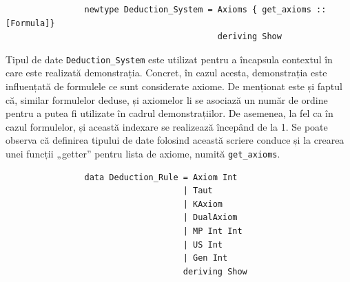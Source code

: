 \documentclass[12pt, openany]{book}
\begin{document}
            \begin{lstlisting}
                newtype Deduction_System = Axioms { get_axioms :: [Formula]}
                                           deriving Show
            \end{lstlisting}

            \par{}
                Tipul de date \texttt{Deduction\_System} este utilizat pentru a încapsula contextul în care este 
                realizată demonstrația. Concret, în cazul acesta, demonstrația este influențată de formulele ce sunt 
                considerate axiome. De menționat este și faptul că, similar formulelor deduse, și axiomelor li se 
                asociază un număr de ordine pentru a putea fi utilizate în cadrul demonstrațiilor. De asemenea, la fel 
                ca în cazul formulelor, și această indexare se realizează începând de la 1. Se poate observa că definirea 
                tipului de date folosind această scriere conduce și la crearea unei funcții „getter” pentru lista de axiome, numită 
                \texttt{get\_axioms}.

            \begin{lstlisting}
                data Deduction_Rule = Axiom Int
                                    | Taut
                                    | KAxiom
                                    | DualAxiom
                                    | MP Int Int
                                    | US Int
                                    | Gen Int
                                    deriving Show
            \end{lstlisting}
\end{document}
